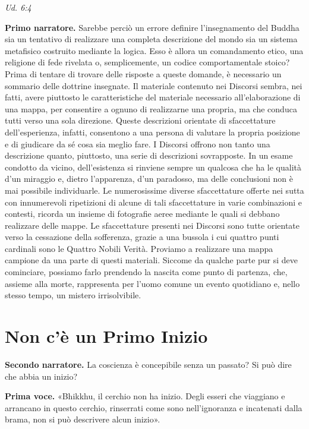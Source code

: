 \emph{Ud. 6:4}


\textbf{Primo narratore.} Sarebbe perciò un errore definire l’insegnamento del
Buddha sia un tentativo di realizzare una completa descrizione del mondo
sia un sistema metafisico costruito mediante la logica. Esso è allora un
comandamento etico, una religione di fede rivelata o, semplicemente, un
codice comportamentale stoico? Prima di tentare di trovare delle
risposte a queste domande, è necessario un sommario delle dottrine
insegnate. Il materiale contenuto nei Discorsi sembra, nei fatti, avere
piuttosto le caratteristiche del materiale necessario all’elaborazione
di una mappa, per consentire a ognuno di realizzarne una propria, ma che
conduca tutti verso una sola direzione. Queste descrizioni orientate di
sfaccettature dell’esperienza, infatti, consentono a una persona di
valutare la propria posizione e di giudicare da sé cosa sia meglio fare.
I Discorsi offrono non tanto una descrizione quanto, piuttosto, una
serie di descrizioni sovrapposte. In un esame condotto da vicino,
dell’esistenza si rinviene sempre un qualcosa che ha le qualità d’un
miraggio e, dietro l’apparenza, d’un paradosso, ma delle conclusioni non
è mai possibile individuarle. Le numerosissime diverse sfaccettature
offerte nei sutta con innumerevoli ripetizioni di alcune di tali
sfaccettature in varie combinazioni e contesti, ricorda un insieme di
fotografie aeree mediante le quali si debbano realizzare delle mappe. Le
sfaccettature presenti nei Discorsi sono tutte orientate verso la
cessazione della sofferenza, grazie a una bussola i cui quattro punti
cardinali sono le Quattro Nobili Verità. Proviamo a realizzare una mappa
campione da una parte di questi materiali. Siccome da qualche parte pur
si deve cominciare, possiamo farlo prendendo la nascita come punto di
partenza, che, assieme alla morte, rappresenta per l’uomo comune un
evento quotidiano e, nello stesso tempo, un mistero irrisolvibile.


\hypertarget{x-non-c’è-un-primo-inizio}{\section*{Non c’è un Primo Inizio}}
\textbf{Secondo narratore.} La coscienza è concepibile senza un passato? Si può
dire che abbia un inizio?


\textbf{Prima voce.} «Bhikkhu, il cerchio non ha inizio. Degli esseri che
viaggiano e arrancano in questo cerchio, rinserrati come sono
nell’ignoranza e incatenati dalla brama, non si può descrivere alcun
inizio».


